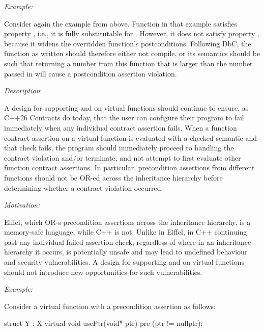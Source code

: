 
\emph{Example:}

Consider again the example from  above. Function  in that example satisfies property , i.e., it is fully substitutable for . However, it does not satisfy property , because it widens the overridden function's postconditions. Following DbC, the function  as written should therefore either not compile, or its semantics should be such that returning a number from this function that is larger than the number passed in will cause a postcondition assertion violation.


\emph{Description}:

A design for supporting  and  on virtual functions should continue to ensure, as C++26 Contracts do today, that the user can configure their program to fail immediately when any individual contract assertion fails. When a function contract assertion on a virtual function is evaluated with a checked semantic and that check fails, the program should immediately proceed to handling the contract violation and/or terminate, and not attempt to first evaluate other function contract assertions. In particular, precondition assertions from different functions should not be OR-ed across the inheritance hierarchy before determining whether a contract violation occurred.

\emph{Motivation:}

Eiffel, which OR-s precondition assertions across the inheritance hierarchy, is a memory-safe language, while C++ is not. Unlike in Eiffel, in C++ continuing past any individual failed assertion check, regardless of where in an inheritance hierarchy it occurs, is potentially unsafe and may lead to undefined behaviour and security vulnerabilities. A design for supporting  and  on virtual functions should not introduce new opportunities for such vulnerabilities.

\emph{Example:}

Consider a virtual function with a precondition assertion as follows:

\begin{codeblock}
struct Y : X {
  virtual void usePtr(void* ptr) 
    pre (ptr != nullptr);
}
\end{codeblock}

